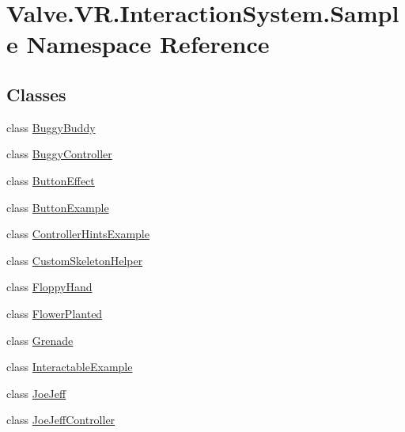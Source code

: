 \hypertarget{namespace_valve_1_1_v_r_1_1_interaction_system_1_1_sample}{}\section{Valve.\+V\+R.\+Interaction\+System.\+Sample Namespace Reference}
\label{namespace_valve_1_1_v_r_1_1_interaction_system_1_1_sample}
\subsection*{Classes}
\begin{DoxyCompactItemize}
\item 
class \mbox{\hyperlink{class_valve_1_1_v_r_1_1_interaction_system_1_1_sample_1_1_buggy_buddy}{Buggy\+Buddy}}
\item 
class \mbox{\hyperlink{class_valve_1_1_v_r_1_1_interaction_system_1_1_sample_1_1_buggy_controller}{Buggy\+Controller}}
\item 
class \mbox{\hyperlink{class_valve_1_1_v_r_1_1_interaction_system_1_1_sample_1_1_button_effect}{Button\+Effect}}
\item 
class \mbox{\hyperlink{class_valve_1_1_v_r_1_1_interaction_system_1_1_sample_1_1_button_example}{Button\+Example}}
\item 
class \mbox{\hyperlink{class_valve_1_1_v_r_1_1_interaction_system_1_1_sample_1_1_controller_hints_example}{Controller\+Hints\+Example}}
\item 
class \mbox{\hyperlink{class_valve_1_1_v_r_1_1_interaction_system_1_1_sample_1_1_custom_skeleton_helper}{Custom\+Skeleton\+Helper}}
\item 
class \mbox{\hyperlink{class_valve_1_1_v_r_1_1_interaction_system_1_1_sample_1_1_floppy_hand}{Floppy\+Hand}}
\item 
class \mbox{\hyperlink{class_valve_1_1_v_r_1_1_interaction_system_1_1_sample_1_1_flower_planted}{Flower\+Planted}}
\item 
class \mbox{\hyperlink{class_valve_1_1_v_r_1_1_interaction_system_1_1_sample_1_1_grenade}{Grenade}}
\item 
class \mbox{\hyperlink{class_valve_1_1_v_r_1_1_interaction_system_1_1_sample_1_1_interactable_example}{Interactable\+Example}}
\item 
class \mbox{\hyperlink{class_valve_1_1_v_r_1_1_interaction_system_1_1_sample_1_1_joe_jeff}{Joe\+Jeff}}
\item 
class \mbox{\hyperlink{class_valve_1_1_v_r_1_1_interaction_system_1_1_sample_1_1_joe_jeff_controller}{Joe\+Jeff\+Controller}}

\end{DoxyCompactItemize}
